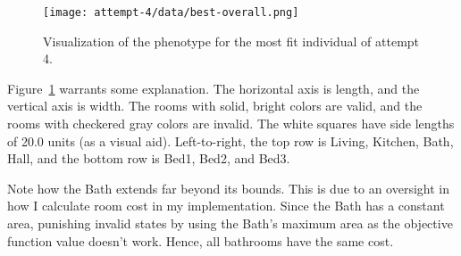 \documentclass[12pt, letterpaper]{article}
\begin{document}
\begin{figure}[H]
    \centerline{\texttt{[image: attempt-4/data/best-overall.png]}}
    \caption{Visualization of the phenotype for the most fit individual of attempt 4.}\label{Fig:FinalPhenotype}
\end{figure}

Figure~\ref{Fig:FinalPhenotype} warrants some explanation.
The horizontal axis is length, and the vertical axis is width.
The rooms with solid, bright colors are valid,
and the rooms with checkered gray colors are invalid.
The white squares have side lengths of 20.0 units (as a visual aid).
Left-to-right, the top row is Living, Kitchen, Bath, Hall,
and the bottom row is Bed1, Bed2, and Bed3.

Note how the Bath extends far beyond its bounds.
This is due to an oversight in how I calculate room cost in my implementation.
Since the Bath has a constant area,
punishing invalid states by using the Bath's maximum area as the objective function value doesn't work.
Hence, all bathrooms have the same cost.

\end{document}
